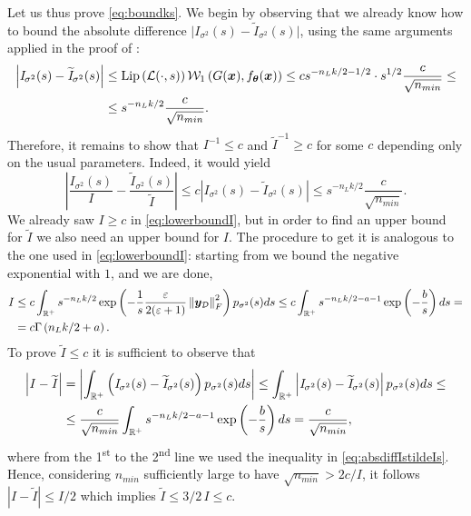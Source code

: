 Let us thus prove \cref{eq:boundks}. We begin by observing that we already know how to bound the absolute difference $\big|\mathit{I}_{\sigma^2}(s) - \widetilde{\mathit{I}}_{\sigma^2}(s)\big|$, using the same arguments applied in the proof of :
\begin{equation} \label{eq:absdiffIstildeIs}
	\begin{aligned}
		\left|\mathit{I}_{\sigma^2}(s) - \widetilde{\mathit{I}}_{\sigma^2}(s)\right| & \leq \lipschitz{\mathcal{L}(\cdot, s)} \wass[1]{G(\bm{x})}{f_{\bm{\theta}}(\bm{x})} \leq c s^{-n_L k / 2 - 1/2} \cdot s^{1/2} \frac{c}{\sqrt{n_{min}}} \leq \\
		& \leq s^{- n_L k /2} \frac{c}{\sqrt{n_{min}}}.
	\end{aligned}
\end{equation}
Therefore, it remains to show that $\mathit{I}^{-1} \leq c$ and $\widetilde{\mathit{I}}^{-1} \geq c$ for some $c$ depending only on the usual parameters.
Indeed, it would yield
\begin{equation*}
	\left|\frac{\mathit{I}_{\sigma^2}(s)}{\mathit{I}} - \frac{\widetilde{\mathit{I}}_{\sigma^2}(s)}{\widetilde{\mathit{I}}}\right| \leq c \left|\mathit{I}_{\sigma^2}(s) - \widetilde{\mathit{I}}_{\sigma^2}(s)\right| \leq s^{- n_L k /2} \frac{c}{\sqrt{n_{min}}}.
\end{equation*}
We already saw $\mathit{I} \geq c$ in \cref{eq:lowerboundI}, but in order to find an upper bound for $\widetilde{\mathit{I}}$ we also need an upper bound for $\mathit{I}$. 
The procedure to get it is analogous to the one used in \cref{eq:lowerboundI}: starting from  we bound the negative exponential with $1$, and we are done,
\begin{align*}
	\mathit{I} & \leq c \int_{\real^+} s^{-n_L k / 2} \exp{-\frac{1}{s} \frac{\epsilon}{2 (\epsilon + 1)} \norm{\bm{y}_{\mathcal{D}}}_F^2} p_{\sigma^2}(s) ds \leq c \int_{\real^+} s^{-n_L k / 2 - a - 1} \exp{-\frac{b}{s}} ds = \\
	& = c \Gamma\left(n_L k / 2 + a\right).
\end{align*}
To prove $\widetilde{\mathit{I}} \leq c$ it is sufficient to observe that 
\begin{align*}
	\left|\mathit{I} - \widetilde{\mathit{I}}\right| & = \left|\int_{\real^+} \left(\mathit{I}_{\sigma^2}(s) - \widetilde{\mathit{I}}_{\sigma^2}(s)\right) p_{\sigma^2}(s) ds\right| \leq \int_{\real^+} \left|\mathit{I}_{\sigma^2}(s) - \widetilde{\mathit{I}}_{\sigma^2}(s)\right| p_{\sigma^2}(s) ds \leq \\
	& \leq \frac{c}{\sqrt{n_{min}}} \int_{\real^+} s^{-n_L k / 2 - a - 1} \exp{-\frac{b}{s}} ds = \frac{c}{\sqrt{n_{min}}},
\end{align*}
where from the 1\textsuperscript{st} to the 2\textsuperscript{nd} line we used the inequality in \cref{eq:absdiffIstildeIs}.
Hence, considering $n_{min}$ sufficiently large to have $\sqrt{n_{min}} > 2c / \mathit{I}$, it follows $|\mathit{I} - \widetilde{\mathit{I}}| \leq \mathit{I} / 2$ which implies $\widetilde{\mathit{I}} \leq 3/2 \, \mathit{I} \leq c$.

